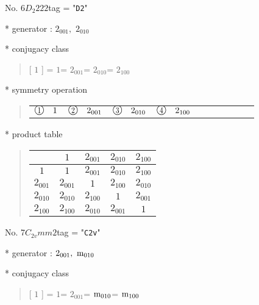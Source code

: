 \documentclass[fleqn,10pt,landscape]{jsarticle}
\begin{document}
\newpage

No. 6\quad$D_{2}$\quad$222$\quad[ orthorhombic ]
tag = "{\tt D2}"

* generator : $2{}_{001},\,\,2{}_{010}$

* conjugacy class
\begin{quote}
[ $1$ ] = \quad $1$\newline[ $2{}_{001}$ ] = \quad $2{}_{001}$\newline[ $2{}_{010}$ ] = \quad $2{}_{010}$\newline[ $2{}_{100}$ ] = \quad $2{}_{100}$\newline
\end{quote}

* symmetry operation
\begin{quote}
\begin{tabular}{llllllllll}
$ {\ooalign{\hfil\resizebox{.8\width}{\height}{1}\hfil\crcr\raise.1ex\hbox{\large$\bigcirc$}}}\quad 1 $ & $ {\ooalign{\hfil\resizebox{.8\width}{\height}{2}\hfil\crcr\raise.1ex\hbox{\large$\bigcirc$}}}\quad 2{}_{001} $ & $ {\ooalign{\hfil\resizebox{.8\width}{\height}{3}\hfil\crcr\raise.1ex\hbox{\large$\bigcirc$}}}\quad 2{}_{010} $ & $ {\ooalign{\hfil\resizebox{.8\width}{\height}{4}\hfil\crcr\raise.1ex\hbox{\large$\bigcirc$}}}\quad 2{}_{100} $
\end{tabular}
\end{quote}

* product table
\begin{quote}
\begin{tabular}{ccccc} \hline \hline
 & $ 1 $ & $ 2{}_{001} $ & $ 2{}_{010} $ & $ 2{}_{100} $ \\ \hline
$ 1 $ & $ 1 $ & $ 2{}_{001} $ & $ 2{}_{010} $ & $ 2{}_{100} $ \\
$ 2{}_{001} $ & $ 2{}_{001} $ & $ 1 $ & $ 2{}_{100} $ & $ 2{}_{010} $ \\
$ 2{}_{010} $ & $ 2{}_{010} $ & $ 2{}_{100} $ & $ 1 $ & $ 2{}_{001} $ \\
$ 2{}_{100} $ & $ 2{}_{100} $ & $ 2{}_{010} $ & $ 2{}_{001} $ & $ 1 $ \\
 \hline \hline
\end{tabular}
\end{quote}

\newpage

No. 7\quad$C_{2v}$\quad$mm2$\quad[ orthorhombic ]
tag = "{\tt C2v}"

* generator : $2{}_{001},\,\,{\rm m}_{010}$

* conjugacy class
\begin{quote}
[ $1$ ] = \quad $1$\newline[ $2{}_{001}$ ] = \quad $2{}_{001}$\newline[ ${\rm m}_{010}$ ] = \quad ${\rm m}_{010}$\newline[ ${\rm m}_{100}$ ] = \quad ${\rm m}_{100}$\newline
\end{quote}
\end{document}
